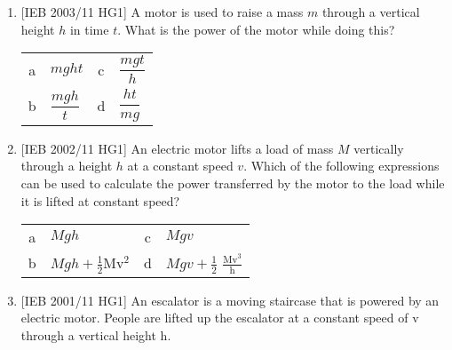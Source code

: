 \begin{eocexercises}{}
\begin{enumerate}
\item{[IEB 2003/11 HG1] A motor is used to raise a mass $m$ through a vertical height $h$ in time $t$.
What is the power of the motor while doing this?
\begin{center}
\begin{tabular}{cp{}cp{}}
  a & $mght$ & c & $\dfrac{mgt}{h}$ \\
  b & $\dfrac{mgh}{t}$ & d & $\dfrac{ht}{mg}$
\end{tabular}
\end{center}
}

\item{[IEB 2002/11 HG1] An electric motor lifts a load of mass $M$ vertically through a height $h$ at a constant speed $v$. Which of the following expressions can be used to calculate the power transferred by the motor to the load while it is lifted at constant speed?
\begin{center}
\begin{tabular}{cp{}cp{}}
  a & $Mgh$ & c & $Mgv$ \\
  b & $Mgh + \tfrac{1}{2}$Mv$^2$ & d & $Mgv + \tfrac{1}{2}$ $\tfrac{\textrm{Mv}^3}{\textrm{h}}$
\end{tabular}
\end{center}
}

\item{[IEB 2001/11 HG1] An escalator is a moving staircase that is powered by an electric motor. People are lifted up the escalator at a constant speed of v through a vertical height h.

}
\end{enumerate}
\end{eocexercises}
